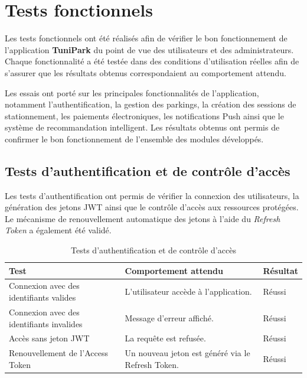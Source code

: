 \section{Tests fonctionnels}

\par Les tests fonctionnels ont été réalisés afin de vérifier le bon fonctionnement de l'application \textbf{TuniPark} du point de vue des utilisateurs et des administrateurs. Chaque fonctionnalité a été testée dans des conditions d'utilisation réelles afin de s'assurer que les résultats obtenus correspondaient au comportement attendu.

\par Les essais ont porté sur les principales fonctionnalités de l'application, notamment l'authentification, la gestion des parkings, la création des sessions de stationnement, les paiements électroniques, les notifications Push ainsi que le système de recommandation intelligent. Les résultats obtenus ont permis de confirmer le bon fonctionnement de l'ensemble des modules développés.

\subsection{Tests d'authentification et de contrôle d'accès}

\par Les tests d'authentification ont permis de vérifier la connexion des utilisateurs, la génération des jetons JWT ainsi que le contrôle d'accès aux ressources protégées. Le mécanisme de renouvellement automatique des jetons à l'aide du \textit{Refresh Token} a également été validé.

\begin{table}[H]
\centering
\small
\renewcommand{\arraystretch}{1.25}
\begin{tabular}{|p{}|p{}|p{}|}
\hline
\textbf{Test} & \textbf{Comportement attendu} & \textbf{Résultat} \\
\hline
Connexion avec des identifiants valides & L'utilisateur accède à l'application. & Réussi \\
\hline
Connexion avec des identifiants invalides & Message d'erreur affiché. & Réussi \\
\hline
Accès sans jeton JWT & La requête est refusée. & Réussi \\
\hline
Renouvellement de l'Access Token & Un nouveau jeton est généré via le Refresh Token. & Réussi \\
\hline
\end{tabular}
\caption{Tests d'authentification et de contrôle d'accès}
\label{tab:auth_tests}
\end{table}

